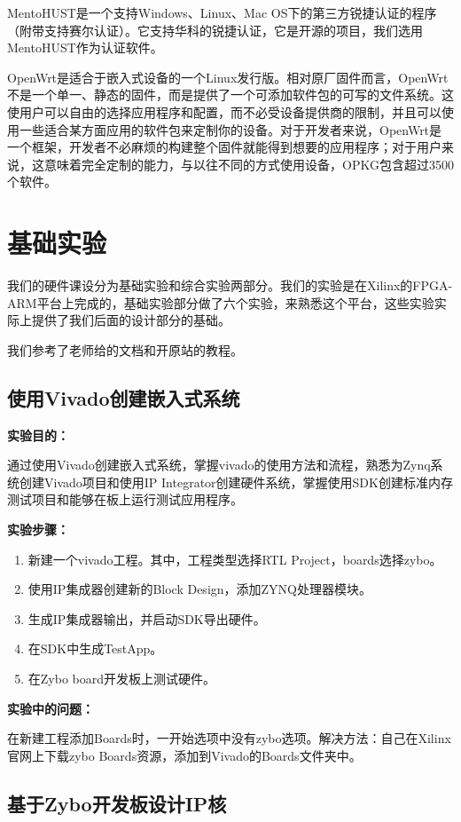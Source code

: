 \documentclass{itecreport-zh}
\begin{document}
MentoHUST是一个支持Windows、Linux、Mac OS下的第三方锐捷认证的程序（附带支持赛尔认证）。它支持华科的锐捷认证，它是开源的项目，我们选用MentoHUST作为认证软件。\cite{MentoHUST}


OpenWrt是适合于嵌入式设备的一个Linux发行版。相对原厂固件而言，OpenWrt不是一个单一、静态的固件，而是提供了一个可添加软件包的可写的文件系统。这使用户可以自由的选择应用程序和配置，而不必受设备提供商的限制，并且可以使用一些适合某方面应用的软件包来定制你的设备。对于开发者来说，OpenWrt是一个框架，开发者不必麻烦的构建整个固件就能得到想要的应用程序；对于用户来说，这意味着完全定制的能力，与以往不同的方式使用设备，OPKG包含超过3500个软件。\cite{OpenWRT}

\chapter{基础实验}

我们的硬件课设分为基础实验和综合实验两部分。我们的实验是在Xilinx的FPGA-ARM平台上完成的，基础实验部分做了六个实验，来熟悉这个平台，这些实验实际上提供了我们后面的设计部分的基础。


我们参考了老师给的文档和开原站的教程。\cite{Zybo}
\section{使用Vivado创建嵌入式系统}
\textbf{实验目的：}


通过使用Vivado创建嵌入式系统，掌握vivado的使用方法和流程，熟悉为Zynq系统创建Vivado项目和使用IP Integrator创建硬件系统，掌握使用SDK创建标准内存测试项目和能够在板上运行测试应用程序。


\textbf{实验步骤：}

\begin{enumerate}
  \item 新建一个vivado工程。其中，工程类型选择RTL Project，boards选择zybo。
  \item 使用IP集成器创建新的Block Design，添加ZYNQ处理器模块。
  \item 生成IP集成器输出，并启动SDK导出硬件。
  \item 在SDK中生成TestApp。
  \item 在Zybo board开发板上测试硬件。
\end{enumerate}
\textbf{实验中的问题：}


在新建工程添加Boards时，一开始选项中没有zybo选项。解决方法：自己在Xilinx官网上下载zybo Boards资源，添加到Vivado的Boards文件夹中。

\section{基于Zybo开发板设计IP核}
\end{document}
